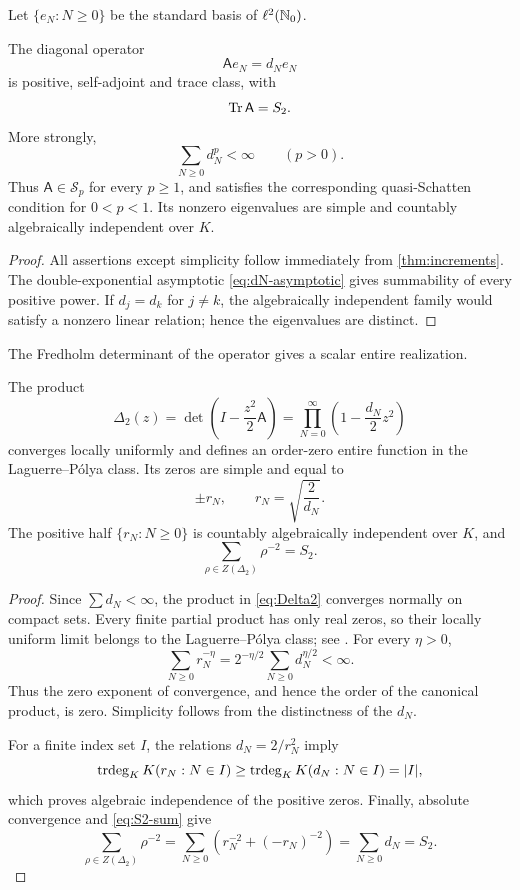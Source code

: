 Let \(\{e_N:N\ge0\}\) be the standard basis of \(\ell^2(\mathbb N_0)\).

\begin{corollary}
\label{cor:operator}
The diagonal operator
\[
 \mathsf A e_N=d_Ne_N
\]
is positive, self-adjoint and trace class, with
\[
 \operatorname{Tr}\mathsf A=S_2.
\]
More strongly,
\[
 \sum_{N\ge0}d_N^p<\infty\qquad(p>0).
\]
Thus \(\mathsf A\in\mathcal S_p\) for every \(p\ge1\), and satisfies the
corresponding quasi-Schatten condition for \(0<p<1\).  Its nonzero
eigenvalues are simple and countably algebraically independent over \(K\).
\end{corollary}

\begin{proof}
All assertions except simplicity follow immediately from
\cref{thm:increments}.  The double-exponential asymptotic
\eqref{eq:dN-asymptotic} gives summability of every positive power.  If
\(d_j=d_k\) for \(j\ne k\), the algebraically independent family would
satisfy a nonzero linear relation; hence the eigenvalues are distinct.
\end{proof}

The Fredholm determinant of the operator gives a scalar entire realization.

\begin{theorem}
\label{thm:Delta2}
The product
\begin{equation}\label{eq:Delta2}
 \Delta_2(z)=
 \det\!\left(I-\frac{z^2}{2}\mathsf A\right)
 =\prod_{N=0}^\infty\left(1-\frac{d_N}{2}z^2\right)
\end{equation}
converges locally uniformly and defines an order-zero entire function in the
Laguerre--P\'olya class.  Its zeros are simple and equal to
\[
 \pm r_N,\qquad r_N=\sqrt{\frac2{d_N}}.
\]
The positive half \(\{r_N:N\ge0\}\) is countably algebraically independent
over \(K\), and
\begin{equation}\label{eq:Delta2-trace}
 \boxed{\displaystyle
 \sum_{\rho\in Z(\Delta_2)}\rho^{-2}=S_2.}
\end{equation}
\end{theorem}

\begin{proof}
Since \(\sum d_N<\infty\), the product in \eqref{eq:Delta2} converges
normally on compact sets.  Every finite partial product has only real zeros,
so their locally uniform limit belongs to the Laguerre--P\'olya class; see
\cite[Chapter~VIII]{Levin1996}.  For every \(\eta>0\),
\[
 \sum_{N\ge0}r_N^{-\eta}
 =2^{-\eta/2}\sum_{N\ge0}d_N^{\eta/2}<\infty.
\]
Thus the zero exponent of convergence, and hence the order of the canonical
product, is zero.  Simplicity follows from the distinctness of the \(d_N\).

For a finite index set \(I\), the relations \(d_N=2/r_N^2\) imply
\[
 \operatorname{trdeg}_KK(r_N:N\in I)
 \ge \operatorname{trdeg}_KK(d_N:N\in I)=|I|,
\]
which proves algebraic independence of the positive zeros.  Finally,
absolute convergence and \eqref{eq:S2-sum} give
\[
 \sum_{\rho\in Z(\Delta_2)}\rho^{-2}
 =\sum_{N\ge0}\left(r_N^{-2}+(-r_N)^{-2}\right)
 =\sum_{N\ge0}d_N=S_2.
\]
\end{proof}

